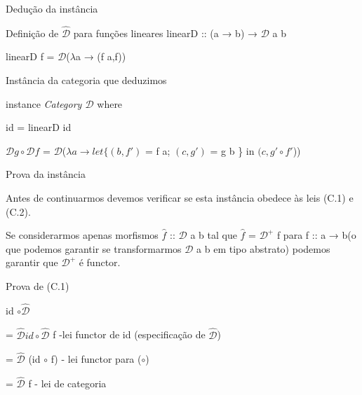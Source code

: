 \documentclass{beamer}
\begin{document}
\begin{frame}{Dedução da instância}


\begin{block}{Definição de $\mathcal{\hat{D}}$ para funções lineares}
linearD :: (a → b) → $\mathcal{D}$ a b

linearD f = $\mathcal{D}$($\lambda$a → (f a,f))
\end{block}

\begin{block}{Instância da categoria que deduzimos}

instance \textit{Category $\mathcal{D}$} where

\hspace{0.2cm}id = linearD id

\hspace{0.2cm}$\mathcal{D} g \circ \mathcal{D} f$ = $\mathcal{D}$($\lambda a → let\{(b,f')$ = f a; $(c,g')$ = g b \} in $(c,g' \circ f'$))

\end{block}


\end{frame}



\begin{frame}{Prova da instância}

Antes de continuarmos devemos verificar se esta instância obedece às leis (C.1) e (C.2).

Se considerarmos apenas morfismos $\hat{f}$ :: $\mathcal{D}$ a b tal que $\hat{f}$ = $\mathcal{D}^{+}$ f para f :: a → b(o que podemos garantir se transformarmos $\mathcal{D}$ a b em tipo abstrato) podemos garantir que $\mathcal{D}^{+}$ é functor.


\begin{block}{Prova de (C.1)}

id $\circ \mathcal{\hat{D}}$ 

=  $\mathcal{\hat{D}} id \circ \mathcal{\hat{D}}$ f -lei functor de id (especificação de $\mathcal{\hat{D}}$)

= $\mathcal{\hat{D}}$ (id $\circ$ f) - lei functor para ($\circ$)

= $\mathcal{\hat{D}}$ f - lei de categoria
\end{block}


\end{frame}
\end{document}

